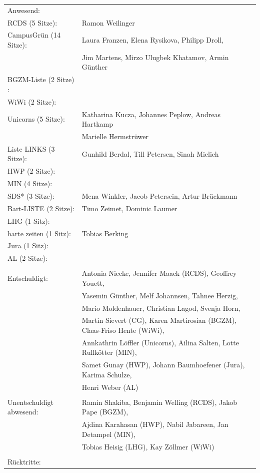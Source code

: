 \documentclass[ngerman,headheight=70pt]{scrartcl}
\begin{document}
    \begin{tabular}{ll}
        Anwesend: & \\
            RCDS (5 Sitze): & Ramon Weilinger \\
             CampusGrün (14 Sitze): & Laura Franzen, Elena Rysikova, Philipp Droll, \\
                                   & Jim Martens, Mirzo Ulugbek Khatamov, Armin Günther \\
             BGZM-Liste (2 Sitze) : & \\
             WiWi (2 Sitze): & \\
             Unicorns (5 Sitze): & Katharina Kucza, Johannes Peplow, Andreas Hartkamp \\
                                 & Marielle Hermstrüwer \\
             Liste LINKS (3 Sitze): & Gunhild Berdal, Till Petersen, Sinah Mielich \\
             HWP (2 Sitze): &  \\
             MIN (4 Sitze): & \\
             SDS* (3 Sitze): & Mena Winkler, Jacob Petersein, Artur Brückmann \\
             Bart-LISTE (2 Sitze): & Timo Zeimet, Dominic Laumer \\
             LHG (1 Sitz): & \\
             harte zeiten (1 Sitz): & Tobias Berking \\
             Jura (1 Sitz): & \\
             AL (2 Sitze): & \\
            & \\
        Entschuldigt: & Antonia Niecke, Jennifer Maack (RCDS), Geoffrey Youett,\\
                      & Yasemin Günther, Melf Johannsen, Tahnee Herzig, \\
                      & Mario Moldenhauer, Christian Lagod, Svenja Horn, \\
                      & Martin Sievert (CG), Karen Martirosian (BGZM), Claas-Friso Hente (WiWi), \\
                      & Annkathrin Löffler (Unicorns), Ailina Salten, Lotte Rullkötter (MIN), \\
                      & Samet Gunay (HWP), Johann Baumhoefener (Jura), Karima Schulze,\\
                      & Henri Weber (AL) \\
                      &\\
        Unentschuldigt abwesend: & Ramin Shakiba, Benjamin Welling (RCDS), Jakob Pape (BGZM), \\
                                & Ajdina Karahasan (HWP), Nabil Jabareen, Jan Detampel (MIN), \\
                                & Tobias Heisig (LHG), Kay Zöllmer (WiWi)\\
                                &\\
        Rücktritte: & \\
    \end{tabular}
\end{document}
